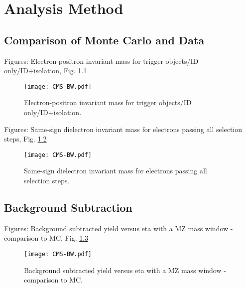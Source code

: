 \chapter{Analysis Method}
\section{Comparison of Monte Carlo and Data}
Figures: Electron-positron invariant mass for trigger objects/ID only/ID+isolation, Fig. \ref{fig:InvMassAfterEachStep}

 \begin{figure}[htb]
  \begin{center}
    \texttt{[image: CMS-BW.pdf]}
  \end{center}
  \caption[Electron-positron invariant mass for trigger objects/ID only/ID+isolation]{Electron-positron invariant mass for trigger objects/ID only/ID+isolation.}
  \label{fig:InvMassAfterEachStep}
 \end{figure}

Figures: Same-sign dielectron invariant mass for electrons passing all selection steps, Fig. \ref{fig:SameSignInvMass}

 \begin{figure}[htb]
  \begin{center}
    \texttt{[image: CMS-BW.pdf]}
  \end{center}
  \caption[Same-sign dielectron invariant mass for electrons passing all selection steps]{Same-sign dielectron invariant mass for electrons passing all selection steps.}
  \label{fig:SameSignInvMass}
 \end{figure}


\section{Background Subtraction}
Figures: Background subtracted yield versus eta with a MZ mass window - comparison to MC, Fig. \ref{fig:YieldVsZEtaComparedToMC}

 \begin{figure}[htb]
  \begin{center}
    \texttt{[image: CMS-BW.pdf]}
  \end{center}
  \caption[Background subtracted yield versus eta with a MZ mass window - comparison to MC]{Background subtracted yield versus eta with a MZ mass window - comparison to MC.}
  \label{fig:YieldVsZEtaComparedToMC}
 \end{figure}

